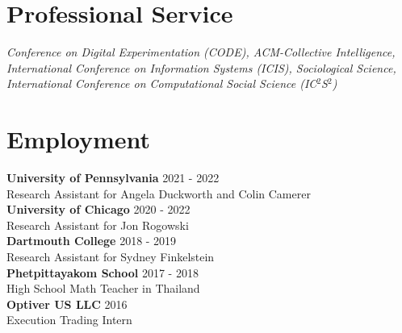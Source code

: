 \documentclass[margin,line,pifont,palatino,courier, 9pt]{res}
\begin{document}
\begin{resume}
\section{\sc Professional Service}
\textit{Conference on Digital Experimentation (CODE), ACM-Collective Intelligence, International Conference on Information Systems (ICIS), Sociological Science, International Conference on Computational Social Science (IC$^2$S$^2$)}

\section{\sc Employment}
\textbf{University of Pennsylvania} \hfill 2021 - 2022 \\
Research Assistant for Angela Duckworth and Colin Camerer \vspace{2mm}\\
\textbf{University of Chicago} \hfill 2020 - 2022\\
Research Assistant for Jon Rogowski \vspace{2mm}\\
\textbf{Dartmouth College} \hfill 2018 - 2019 \\
Research Assistant for Sydney Finkelstein \vspace{2mm}\\
\textbf{Phetpittayakom School} \hfill 2017 - 2018 \\
High School Math Teacher in Thailand \vspace{2mm}\\
\textbf{Optiver US LLC} \hfill 2016 \\
Execution Trading Intern

\end{resume}
\end{document}

